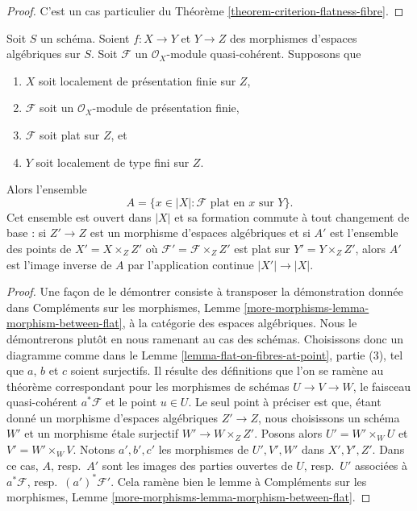 \begin{proof}
C'est un cas particulier du
Théorème \ref{theorem-criterion-flatness-fibre}.
\end{proof}

\begin{lemma}
\label{lemma-base-change-criterion-flatness-fibre}
Soit $S$ un schéma. Soient $f : X \to Y$ et $Y \to Z$ des morphismes
d'espaces algébriques sur $S$. Soit $\mathcal{F}$ un
$\mathcal{O}_X$-module quasi-cohérent.
Supposons que
\begin{enumerate}
\item $X$ soit localement de présentation finie sur $Z$,
\item $\mathcal{F}$ soit un $\mathcal{O}_X$-module de présentation finie,
\item $\mathcal{F}$ soit plat sur $Z$, et
\item $Y$ soit localement de type fini sur $Z$.
\end{enumerate}
Alors l'ensemble
$$
A = \{x \in |X| : \mathcal{F} \text{ plat en }x \text{ sur }Y\}.
$$
Cet ensemble est ouvert dans $|X|$ et sa formation commute à tout changement de base :
si $Z' \to Z$ est un morphisme d'espaces algébriques et si $A'$ est l'ensemble des
points de $X' = X \times_Z Z'$ où $\mathcal{F}' = \mathcal{F} \times_Z Z'$
est plat sur $Y' = Y \times_Z Z'$, alors $A'$ est l'image inverse de
$A$ par l'application continue $|X'| \to |X|$.
\end{lemma}

\begin{proof}
Une façon de le démontrer consiste à transposer la démonstration donnée dans
Compléments sur les morphismes, Lemme \ref{more-morphisms-lemma-morphism-between-flat},
à la catégorie des espaces algébriques. Nous le démontrerons plutôt
en nous ramenant au cas des schémas. Choisissons donc un diagramme comme dans le
Lemme \ref{lemma-flat-on-fibres-at-point}, partie (3),
tel que $a$, $b$ et $c$ soient surjectifs.
Il résulte des définitions que l'on se ramène au
théorème correspondant pour les morphismes de schémas
$U \to V \to W$, le faisceau quasi-cohérent $a^*\mathcal{F}$
et le point $u \in U$. Le seul point à préciser est que,
étant donné un morphisme d'espaces algébriques $Z' \to Z$, nous choisissons un schéma
$W'$ et un morphisme étale surjectif $W' \to W \times_Z Z'$.
Posons alors $U' = W' \times_W U$ et $V' = W' \times_W V$.
Notons $a', b', c'$ les morphismes de $U', V', W'$ dans
$X', Y', Z'$. Dans ce cas, $A$, resp.\ $A'$ sont les images des parties
ouvertes de $U$, resp.\ $U'$ associées à
$a^*\mathcal{F}$, resp.\ $(a')^*\mathcal{F}'$.
Cela ramène bien le lemme à
Compléments sur les morphismes, Lemme \ref{more-morphisms-lemma-morphism-between-flat}.
\end{proof}

